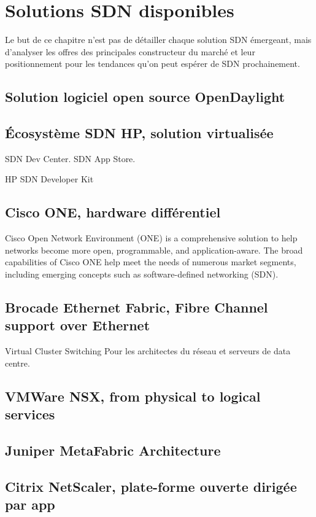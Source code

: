 \chapter{Solutions SDN disponibles}

Le but de ce chapitre n'est pas de détailler chaque solution SDN émergeant, mais d'analyser les offres des principales constructeur du marché et leur positionnement pour les tendances qu'on peut espérer de SDN prochainement.

\section{Solution logiciel open source OpenDaylight}

\section{Écosystème SDN HP, solution virtualisée}

SDN Dev Center.
SDN App Store.

HP SDN Developer Kit


\section{Cisco ONE, hardware différentiel}

Cisco Open Network Environment (ONE) is a comprehensive solution to help networks become more open, programmable, and application-aware. The broad capabilities of Cisco ONE help meet the needs of numerous market segments, including emerging concepts such as software-defined networking (SDN).

\section{Brocade Ethernet Fabric, Fibre Channel support over Ethernet}
Virtual Cluster Switching
Pour les architectes du réseau et serveurs de data centre.

\section{VMWare NSX, from physical to logical services}

\section{Juniper MetaFabric Architecture}

\section{Citrix NetScaler, plate-forme ouverte dirigée par app }



